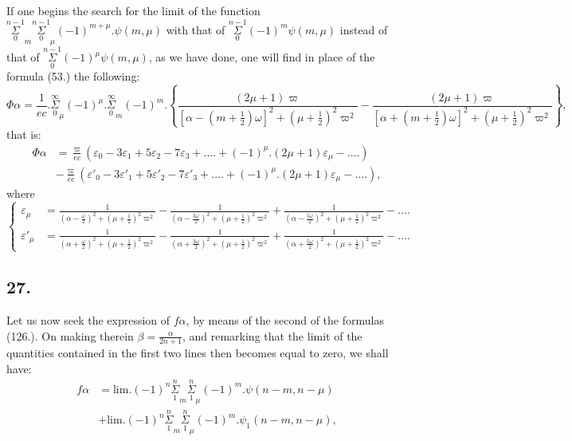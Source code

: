 \documentclass{article}
\begin{document}
If one begins the search for the limit of the function $\overset{n-1}{\underset{0}{\Sigma}}_{m}\overset{n-1}{\underset{0}{\Sigma}}_{\mu}(-1)^{m+\mu}.\psi(m,\mu)$ with that of $\overset{n-1}{\underset{0}{\Sigma}}(-1)^{m}\psi(m,\mu)$ instead of that of $\overset{n-1}{\underset{0}{\Sigma}}(-1)^{\mu}\psi(m,\mu)$, as we have done, one will find in place of the formula (53.) the following:
\[ \Phi\alpha=\frac{1}{ec}.\overset{\infty}{\underset{0}{\Sigma}}_{\mu}(-1)^{\mu}.\overset{\infty}{\underset{0}{\Sigma}}_{m}(-1)^{m}.\left\{\frac{(2\mu+1)\varpi}{[\alpha-(m+\tfrac{1}{2})\omega]^{2}+(\mu+\tfrac{1}{2})^{2}\varpi^{2}}-\frac{(2\mu+1)\varpi}{[\alpha+(m+\tfrac{1}{2})\omega]^{2}+(\mu+\tfrac{1}{2})^{2}\varpi^{2}}\right\}, \tag{156.} \]
that is:
\[ \begin{aligned}\Phi\alpha&=\frac{\varpi}{ec}(\varepsilon_{0}-3\varepsilon_{1}+5\varepsilon_{2}-7\varepsilon_{3}+....+(-1)^{\mu}.(2\mu+1)\varepsilon_{\mu}-....)\\ &-\frac{\varpi}{ec}(\varepsilon'_{0}-3\varepsilon'_{1}+5\varepsilon'_{2}-7\varepsilon'_{3}+....+(-1)^{\mu}.(2\mu+1)\varepsilon_{\mu}-....),\end{aligned} \tag{157.} \]
where
\[ \left\{\begin{aligned}\varepsilon_{\mu}&=\frac{1}{\left(\alpha-\frac{\omega}{2}\right)^{2}+(\mu+\tfrac{1}{2})^{2}\varpi^{2}}-\frac{1}{\left(\alpha-\frac{3\omega}{2}\right)^{2}+(\mu+\tfrac{1}{2})^{2}\varpi^{2}}+\frac{1}{\left(\alpha-\frac{5\omega}{2}\right)^{2}+(\mu+\tfrac{1}{2})^{2}\varpi^{2}}-....\\ \varepsilon'_{\mu}&=\frac{1}{\left(\alpha+\frac{\omega}{2}\right)^{2}+(\mu+\tfrac{1}{2})^{2}\varpi^{2}}-\frac{1}{\left(\alpha+\frac{3\omega}{2}\right)^{2}+(\mu+\tfrac{1}{2})^{2}\varpi^{2}}+\frac{1}{\left(\alpha+\frac{5\omega}{2}\right)^{2}+(\mu+\tfrac{1}{2})^{2}\varpi^{2}}-....\end{aligned}\right. \tag{158.} \]

\subsection*{27.}

Let us now seek the expression of $f\alpha$, by means of the second of the formulas (126.). On making therein $\beta=\frac{\alpha}{2n+1}$, and remarking that the limit of the quantities contained in the first two lines then becomes equal to zero, we shall have:
\[ \begin{aligned}f\alpha&=\text{lim.}(-1)^{n}\overset{n}{\underset{1}{\Sigma}}_{m}\overset{n}{\underset{1}{\Sigma}}_{\mu}(-1)^{m}.\psi(n-m,n-\mu)\\ &+\text{lim.}(-1)^{n}\overset{n}{\underset{1}{\Sigma}}_{m}\overset{n}{\underset{1}{\Sigma}}_{\mu}(-1)^{m}.\psi_{1}(n-m,n-\mu),\end{aligned} \tag{159.} \]
\end{document}
